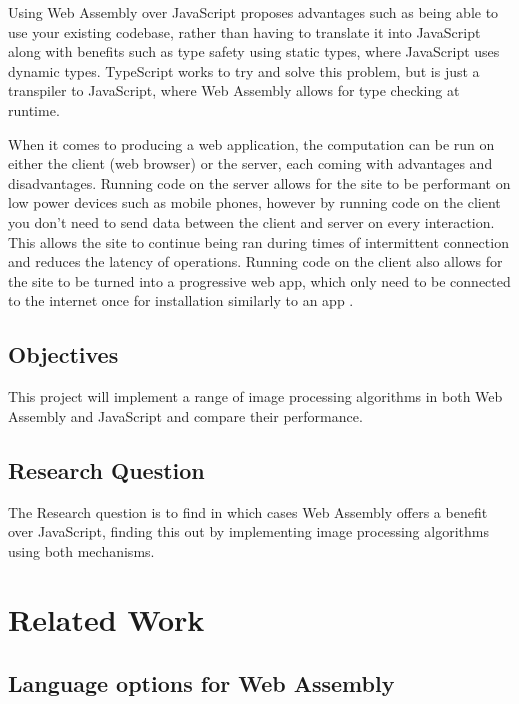 \documentclass[12pt,a4paper]{article}
\begin{document}
Using Web Assembly over JavaScript proposes advantages such as being able to use your existing codebase, rather than having to translate it into JavaScript along with benefits such as type safety using static types, where JavaScript uses dynamic types. TypeScript works to try and solve this problem, but is just a transpiler to JavaScript, where Web Assembly allows for type checking at runtime.

When it comes to producing a web application, the computation can be run on either the client (web browser) or the server, each coming with advantages and disadvantages. Running code on the server allows for the site to be performant on low power devices such as mobile phones, however by running code on the client you don't need to send data between the client and server on every interaction. This allows the site to continue being ran during times of intermittent connection and reduces the latency of operations. Running code on the client also allows for the site to be turned into a progressive web app, which only need to be connected to the internet once for installation similarly to an app \cite{biorn2017progressive}.






\subsection{Objectives}

This project will implement a range of image processing algorithms in both Web Assembly and JavaScript and compare their performance.


\subsection{Research Question}

The Research question is to find in which cases Web Assembly offers a benefit over JavaScript, finding this out by implementing image processing algorithms using both mechanisms.





\section{Related Work}

\subsection{Language options for Web Assembly}
\end{document}
